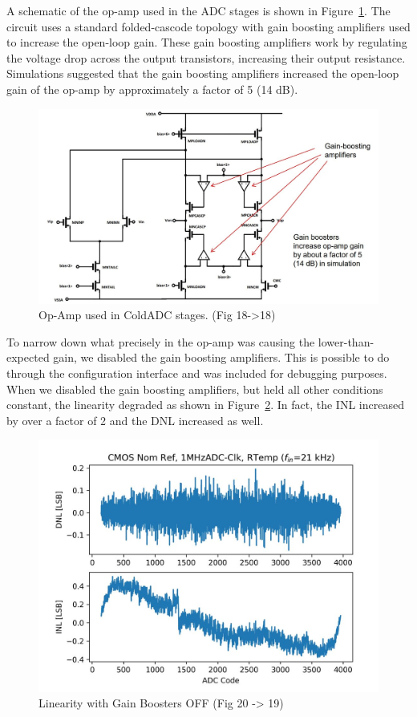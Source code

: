 A schematic of the op-amp used in the ADC stages is shown in Figure~\ref{fig:op_amp_1}. The circuit uses a standard folded-cascode topology with gain boosting amplifiers used to increase the open-loop gain. These gain boosting amplifiers work by regulating the voltage drop across the output transistors, increasing their output resistance. Simulations suggested that the gain boosting amplifiers increased the open-loop gain of the op-amp by approximately a factor of 5 (14 dB).

\begin{figure}[h!]
\centering
  \includegraphics[width=0.9\linewidth]{figures/prakash_fig/op_amp.JPG}
  \caption{Op-Amp used in ColdADC stages. (Fig 18->18)}
  \label{fig:op_amp_1}
\end{figure}

To narrow down what precisely in the op-amp was causing the lower-than-expected gain, we disabled the gain boosting amplifiers. This is possible to do through the configuration interface and was included for debugging purposes. When we disabled the gain boosting amplifiers, but held all other conditions constant, the linearity degraded as shown in Figure~\ref{fig:linearity_GB_OFF}. In fact, the INL increased by over a factor of 2 and the DNL increased as well.


\begin{figure}[h!]
\centering
  \includegraphics[width=0.6\linewidth]{figures/prakash_fig/linearity_GB_OFF.JPG}
  \caption{Linearity with Gain Boosters OFF (Fig 20 -> 19)}
  \label{fig:linearity_GB_OFF}
\end{figure}

